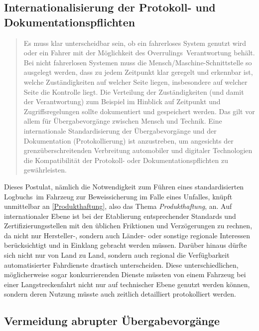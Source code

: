 \documentclass[twoside,a4paper,12pt]{article}
\begin{document}
\subsection{Internationalisierung der Protokoll- und Dokumentationspflichten} \label{InternationaleStandardisierungDerProtokollUndDokumentationspflichten}

\begin{quote}
\glqq
Es muss klar unterscheidbar sein, ob ein fahrerloses System genutzt wird oder ein Fahrer
mit der Möglichkeit des \glqq Overrulings\grqq\ Verantwortung behält. Bei nicht fahrerlosen Systemen muss die Mensch/Maschine-Schnittstelle 
so ausgelegt werden, dass zu jedem Zeitpunkt klar geregelt und erkennbar ist, welche Zuständigkeiten auf welcher Seite liegen,
insbesondere auf welcher Seite die Kontrolle liegt. Die Verteilung der Zuständigkeiten
(und damit der Verantwortung) zum Beispiel im Hinblick auf Zeitpunkt und Zugriffsregelungen sollte dokumentiert und gespeichert werden. 
Das gilt vor allem für Übergabevorgänge zwischen Mensch und Technik. Eine internationale Standardisierung der Übergabevorgänge 
und der Dokumentation (Protokollierung) ist anzustreben, um angesichts der
grenzüberschreitenden Verbreitung automobiler und digitaler Technologien die Kompatibilität der Protokoll- oder 
Dokumentationspflichten zu gewährleisten.\grqq\mbox{~\cite[S. 13]{ek}}
\end{quote}

Dieses Postulat, nämlich die Notwendigkeit zum Führen eines standardisierten \glqq Logbuchs\grqq\ im Fahrzeug zur Beweissicherung im Falle eines Unfalles, 
knüpft unmittelbar an \ref{Produkthaftung}, also das Thema \textit{Produkthaftung}, an. Auf internationaler Ebene ist bei der Etablierung entsprechender 
Standards und Zertifizierungsstellen mit den üblichen Friktionen und Verzögerungen zu rechnen, da nicht nur Hersteller-, sondern auch Länder- oder 
sonstige regionale Interessen berücksichtigt und in Einklang gebracht werden müssen. Darüber hinaus dürfte sich nicht nur von Land zu Land, sondern auch
regional die Verfügbarkeit automatisierter Fahrdienste drastisch unterscheiden. Diese unterschiedlichen, möglicherweise sogar konkurrierenden Dienste müssten von einem Fahrzeug bei einer Langstreckenfahrt nicht nur auf technischer Ebene genutzt werden können, sondern deren Nutzung müsste auch zeitlich detailliert protokolliert werden.

\subsection{Vermeidung abrupter Übergabevorgänge} \label{VermeidungAbrupterUebergabevorgaenge}
\end{document}
